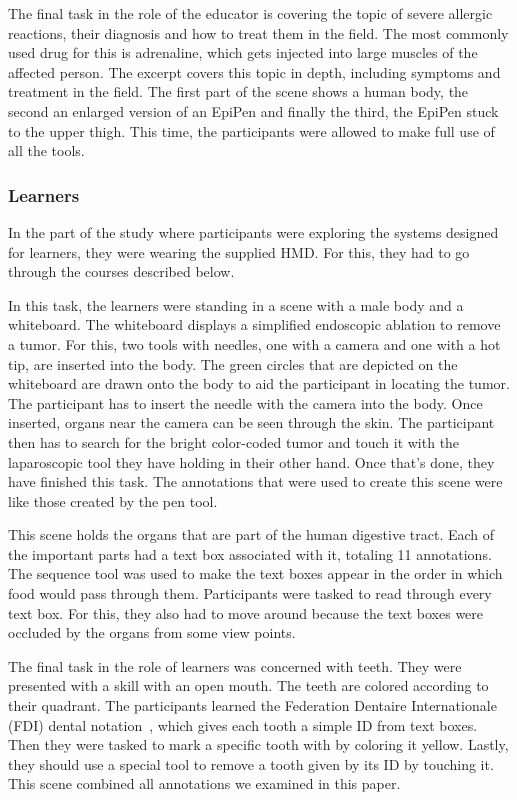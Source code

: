  The final task in the role of the educator is covering the topic of severe allergic reactions, their diagnosis and how to treat them in the field. The most commonly used drug for this is adrenaline, which gets injected into large muscles of the affected person. The excerpt covers this topic in depth, including symptoms and treatment in the field. The first part of the scene shows a human body, the second an enlarged version of an EpiPen and finally the third, the EpiPen stuck to the upper thigh. This time, the participants were allowed to make full use of all the tools.

\subsubsection{Learners}

In the part of the study where participants were exploring the systems designed for learners, they were wearing the supplied HMD. For this, they had to go through the courses described below. 

 In this task, the learners were standing in a scene with a male body and a whiteboard. The whiteboard displays a simplified endoscopic ablation to remove a tumor. For this, two tools with needles, one with a camera and one with a hot tip, are inserted into the body. The green circles that are depicted on the whiteboard are drawn onto the body to aid the participant in locating the tumor. The participant has to insert the needle with the camera into the body. Once inserted, organs near the camera can be seen through the skin. The participant then has to search for the bright color-coded tumor and touch it with the laparoscopic tool they have holding in their other hand. Once that's done, they have finished this task. The annotations that were used to create this scene were like those created by the pen tool.

 This scene holds the organs that are part of the human digestive tract. Each of the important parts had a text box associated with it, totaling 11 annotations. The sequence tool was used to make the text boxes appear in the order in which food would pass through them. Participants were tasked to read through every text box. For this, they also had to move around because the text boxes were occluded by the organs from some view points.

 The final task in the role of learners was concerned with teeth. They were presented with a skill with an open mouth. The teeth are colored according to their quadrant. The participants learned the Federation Dentaire Internationale (FDI) dental notation~\cite{isoTeeth}, which gives each tooth a simple ID from text boxes. Then they were tasked to mark a specific tooth with by coloring it yellow. Lastly, they should use a special tool to remove a tooth given by its ID by touching it. This scene combined all annotations we examined in this paper.

